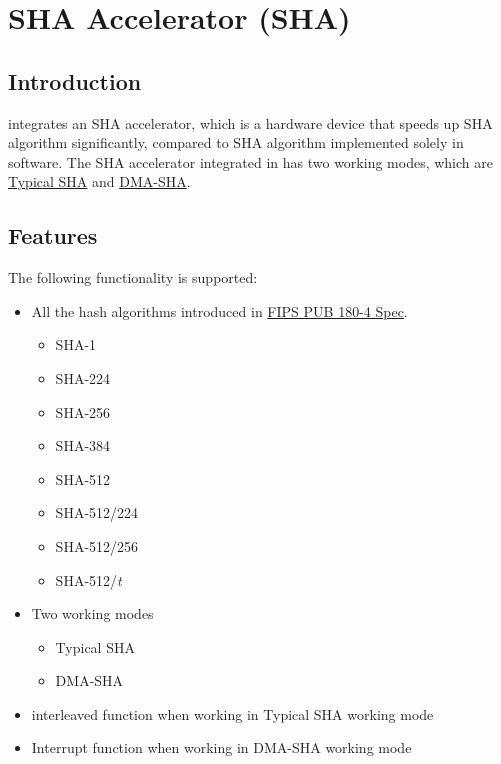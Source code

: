\documentclass[main\_\_EN.tex]{subfiles}
\begin{document}

\ifglobal
\else
    {\let\clearpage\relax \listoftodos}
    \tableofcontents
\fi



\hypertarget{sha}{}
\chapter{SHA Accelerator (SHA)}
\label{mod:sha}
\section{Introduction}

\chipname{} integrates an SHA accelerator, which is a hardware device that speeds up SHA algorithm significantly, compared to SHA algorithm implemented solely in software. The SHA accelerator integrated in \chipname{} has two working modes, which are  \hyperref[sec:sha-typical-sha]{Typical SHA} and  \hyperref[sec:sha-dma-sha]{DMA-SHA}.

\section{Features}

The following functionality is supported:

\begin{itemize}
    \item All the hash algorithms introduced in   \href{https://doi.org/10.6028/NIST.FIPS.180-4}{FIPS PUB 180-4 Spec}.
    \begin{itemize}
        \item SHA-1
        \item SHA-224
        \item SHA-256
        \item SHA-384
        \item SHA-512
        \item SHA-512/224
        \item SHA-512/256
        \item SHA-512/{\it{t}}
    \end{itemize}
    \item Two working modes
    \begin{itemize}
        \item Typical SHA
        \item DMA-SHA
    \end{itemize}
    \item interleaved function when working in Typical SHA working mode
    \item Interrupt function when working in DMA-SHA working mode
\end{itemize}
\end{document}
